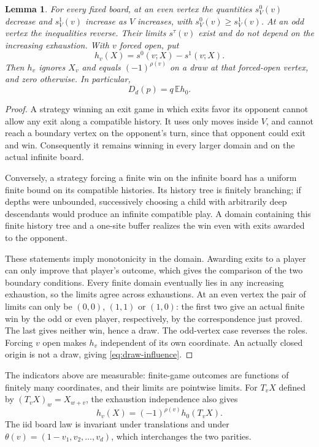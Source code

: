 \documentclass[11pt,a4paper]{article}
\newcommand{\E}{\mathbb E}
\newtheorem{lemma}[theorem]{Lemma}
\numberwithin{equation}{section}
\begin{document}
\begin{lemma}\label{lem:infinite}
For every fixed board, at an even vertex the quantities $s_V^0(v)$
decrease and $s_V^1(v)$ increase as $V$ increases, with
$s_V^0(v)\ge s_V^1(v)$. At an odd vertex the inequalities reverse.
Their limits $s^\tau(v)$ exist and do not depend on the increasing
exhaustion. With $v$ forced open, put
\[
 h_v(X)=s^0(v;X)-s^1(v;X).
\]
Then $h_v$ ignores $X_v$ and equals $(-1)^{\rho(v)}$ on a draw at that
forced-open vertex, and zero otherwise. In particular,
\begin{equation}\label{eq:draw-influence}
 D_d(p)=q\,\E h_0.
\end{equation}
\end{lemma}
\begin{proof}
A strategy winning an exit game in which exits favor its opponent cannot
allow any exit along a compatible history. It uses only moves inside $V$,
and cannot reach a boundary vertex on the opponent's turn, since that
opponent could exit and win. Consequently it remains winning in every
larger domain and on the actual infinite board.

Conversely, a strategy forcing a finite win on the infinite board has a
uniform finite bound on its compatible histories. Its history tree is
finitely branching; if depths were unbounded, successively choosing a
child with arbitrarily deep descendants would produce an infinite
compatible play. A domain containing this finite history tree and a
one-site buffer realizes the win even with exits awarded to the opponent.

These statements imply monotonicity in the domain. Awarding exits to a player can only improve that player's outcome, which
gives the comparison of the two boundary conditions. Every finite domain
eventually lies in any increasing exhaustion, so the limits agree across
exhaustions. At an even vertex the pair of limits can only be $(0,0)$,
$(1,1)$ or $(1,0)$: the first two give an actual finite win by the odd or
even player, respectively, by the correspondence just proved. The last
gives neither win, hence a draw. The odd-vertex case reverses the roles.
Forcing $v$ open makes $h_v$ independent of its own coordinate. An actually
closed origin is not a draw, giving \eqref{eq:draw-influence}.
\end{proof}

The indicators above are measurable: finite-game outcomes are functions
of finitely many coordinates, and their limits are pointwise limits.
For $T_vX$ defined by $(T_vX)_w=X_{w+v}$, the exhaustion independence also
gives
\begin{equation}\label{eq:translation-h}
 h_v(X)=(-1)^{\rho(v)}h_0(T_vX).
\end{equation}
The iid board law is invariant under translations and under
$\theta(v)=(1-v_1,v_2,\ldots,v_d)$, which interchanges the two parities.
\end{document}
